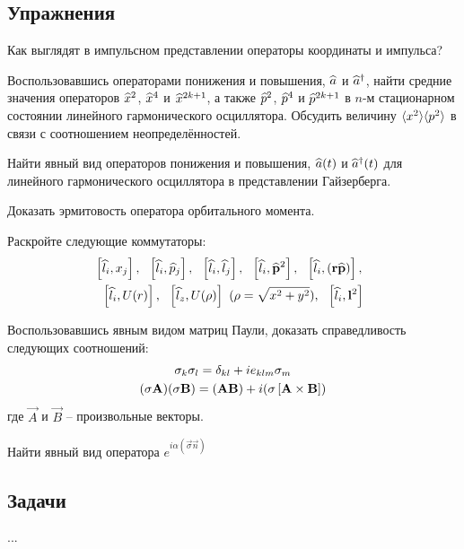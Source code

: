 \subsection*{\hfil Упражнения \hfil}
%
\begin{exercise}
\item\label{ex:1_2_1}%
Как выглядят в импульсном представлении операторы координаты и импульса?
%
\item\label{ex:1_2_2}%
Воспользовавшись операторами понижения и повышения, $\widehat{a}$ и $\widehat{a}^\dag$, найти средние значения операторов $\widehat{x}^2$, $\widehat{x}^4$ и $\widehat{x}^{2k+1}$, а также $\widehat{p}^2$, $\widehat{p}^4$ и $\widehat{p}^{2k+1}$ в $n$-м стационарном состоянии линейного гармонического осциллятора. Обсудить величину $\langle{x^2}\rangle\langle{p^2}\rangle$ в связи с соотношением неопределённостей.
%
\item\label{ex:1_2_3}%
Найти явный вид операторов понижения и повышения, $\widehat{a}(t)$ и $\widehat{a}^\dag(t)$ для линейного гармонического осциллятора в представлении Гайзерберга.
%
\item\label{ex:1_2_4}%
Доказать эрмитовость оператора орбитального момента.
%
\item\label{ex:1_2_5}%
Раскройте следующие коммутаторы:
$$
\begin{gathered}
\brs{\op{l}_i, x_j},~~ \brs{\op{l}_i, \op{p}_j},~~
\brs{\op{l}_i, \op{l}_j},~~ \brs{\op{l}_i, \op{\vp}^2},~~
\brs{\op{l}_i, (\vr \op{\vp})},~~ \\
%
\brs{\op{l}_i, U(r)},~~
\brs{\op{l}_z, U(\rho)}~ (\rho = \sqrt{x^2 + y^2}),~~ \brs{\op{l}_i, \vec{l}^2}
\end{gathered}
$$
%
\item\label{ex:1_2_6}%
Воспользовавшись явным видом матриц Паули, доказать справедливость следующих соотношений:
$$
\begin{gathered}
\sigma_k \sigma_l = \delta_{kl} + ie_{klm} \sigma_m \\
(\mathbf{\sigma} \mathbf{A}) (\mathbf{\sigma} \mathbf{B})
  = (\mathbf{A} \mathbf{B}) + i(\mathbf{\sigma} \left [ {\mathbf{A} \times \mathbf{B}} \right ])
\end{gathered}
$$%
%
где $\vec{A}$ и $\vec{B}$ -- произвольные векторы.
%
\item\label{ex:1_2_7}%
Найти явный вид оператора $e^{i\alpha(\vec{\sigma} \vec{n})}$
\end{exercise}

\subsection*{\hfil Задачи \hfil}
%
\begin{problem}
\item ...
\end{problem}



